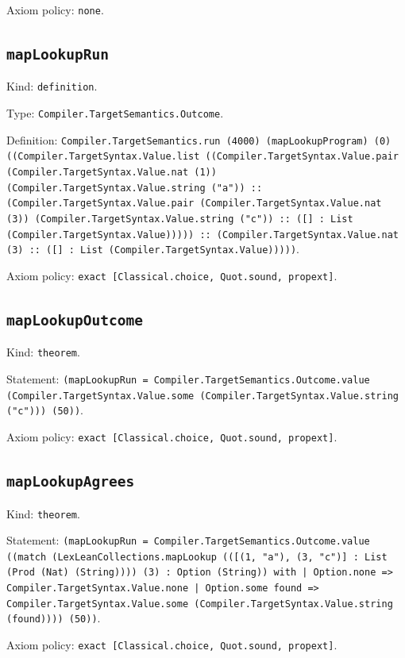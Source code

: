 \documentclass[11pt]{article}
\begin{document}
\noindent Axiom policy: \texttt{none}.\par
\subsection*{\texttt{mapLookupRun}}
\noindent Kind: \texttt{definition}.\par
\noindent Type: \texttt{Compiler.TargetSemantics.Outcome}.\par
\noindent Definition: \texttt{Compiler.TargetSemantics.run (4000) (mapLookupProgram) (0) ((Compiler.TargetSyntax.Value.list ((Compiler.TargetSyntax.Value.pair (Compiler.TargetSyntax.Value.nat (1)) (Compiler.TargetSyntax.Value.string ("a")) :: (Compiler.TargetSyntax.Value.pair (Compiler.TargetSyntax.Value.nat (3)) (Compiler.TargetSyntax.Value.string ("c")) :: ([] : List (Compiler.TargetSyntax.Value))))) :: (Compiler.TargetSyntax.Value.nat (3) :: ([] : List (Compiler.TargetSyntax.Value)))))}.\par
\noindent Axiom policy: \texttt{exact [Classical.choice, Quot.sound, propext]}.\par
\subsection*{\texttt{mapLookupOutcome}}
\noindent Kind: \texttt{theorem}.\par
\noindent Statement: \texttt{(mapLookupRun = Compiler.TargetSemantics.Outcome.value (Compiler.TargetSyntax.Value.some (Compiler.TargetSyntax.Value.string ("c"))) (50))}.\par
\noindent Axiom policy: \texttt{exact [Classical.choice, Quot.sound, propext]}.\par
\subsection*{\texttt{mapLookupAgrees}}
\noindent Kind: \texttt{theorem}.\par
\noindent Statement: \texttt{(mapLookupRun = Compiler.TargetSemantics.Outcome.value ((match (LexLeanCollections.mapLookup (([(1, "a"), (3, "c")] : List (Prod (Nat) (String)))) (3) : Option (String)) with | Option.none => Compiler.TargetSyntax.Value.none | Option.some found => Compiler.TargetSyntax.Value.some (Compiler.TargetSyntax.Value.string (found)))) (50))}.\par
\noindent Axiom policy: \texttt{exact [Classical.choice, Quot.sound, propext]}.\par
\end{document}
